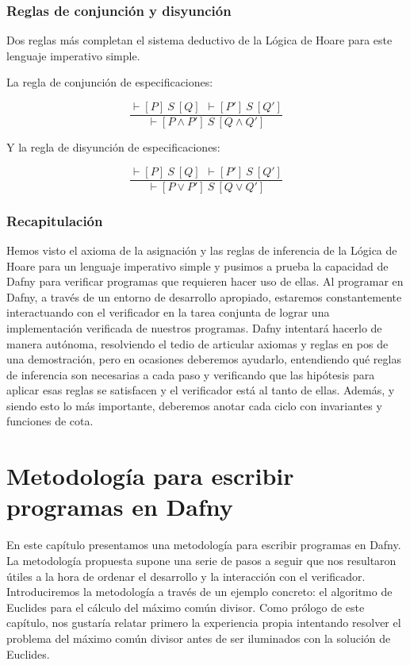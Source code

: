 \documentclass[12pt, a4paper, openany, fleqn]{book}
\newcommand{\hoareTheorem}[3]{\ensuremath{\vdash[#1]\ #2\ [#3]}}
\newcommand{\inferenceRule}[2]{
    \begin{equation*}
        \frac{#1}{#2}
    \end{equation*}
}
\begin{document}
    \subsection{Reglas de conjunción y disyunción}
    Dos reglas más completan el sistema deductivo de la Lógica de Hoare para este lenguaje imperativo simple.

    La regla de conjunción de especificaciones:
    \inferenceRule{\hoareTheorem{P}{S}{Q}\ \ \hoareTheorem{P'}{S}{Q'}}{\hoareTheorem{P \land P'}{S}{Q \land Q'}}

    Y la regla de disyunción de especificaciones:
    \inferenceRule{\hoareTheorem{P}{S}{Q}\ \ \hoareTheorem{P'}{S}{Q'}}{\hoareTheorem{P \lor P'}{S}{Q \lor Q'}}

    \subsection{Recapitulación}
    Hemos visto el axioma de la asignación y las reglas de inferencia de la Lógica de Hoare para un lenguaje imperativo simple y pusimos a prueba la capacidad de Dafny para verificar programas que requieren hacer uso de ellas. Al programar en Dafny, a través de un entorno de desarrollo apropiado, estaremos constantemente interactuando con el verificador en la tarea conjunta de lograr una implementación verificada de nuestros programas. Dafny intentará hacerlo de manera autónoma, resolviendo el tedio de articular axiomas y reglas en pos de una demostración, pero en ocasiones deberemos ayudarlo, entendiendo qué reglas de inferencia son necesarias a cada paso y verificando que las hipótesis para aplicar esas reglas se satisfacen y el verificador está al tanto de ellas. Además, y siendo esto lo más importante, deberemos anotar cada ciclo con invariantes y funciones de cota.

    \chapter{Metodología para escribir programas en Dafny}
    En este capítulo presentamos una metodología para escribir programas en Dafny. La metodología propuesta supone una serie de pasos a seguir que nos resultaron útiles a la hora de ordenar el desarrollo y la interacción con el verificador.
    Introduciremos la metodología a través de un ejemplo concreto: el algoritmo de Euclides para el cálculo del máximo común divisor. Como prólogo de este capítulo, nos gustaría relatar primero la experiencia propia intentando resolver el problema del máximo común divisor antes de ser iluminados con la solución de Euclides.
\end{document}
